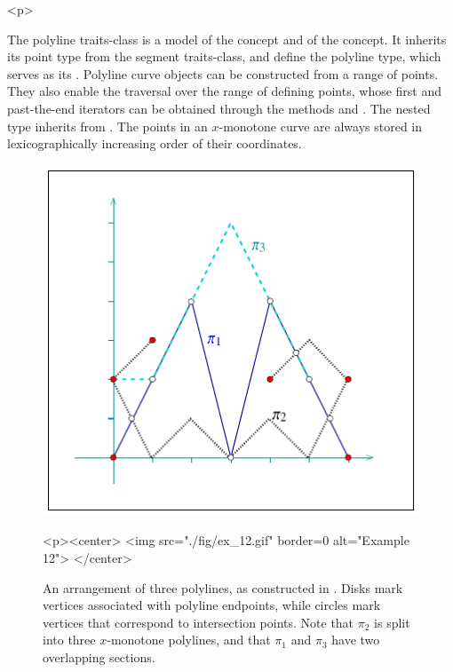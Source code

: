 \begin{ccHtmlOnly}<p>\end{ccHtmlOnly}
The polyline traits-class is a model of the
 concept and of the
 concept. It inherits its point
type from the segment traits-class, and define the polyline type,
which serves as its . Polyline curve objects can be
constructed from a range of points. They also enable the traversal
over the range of defining points, whose first and past-the-end
iterators can be obtained through the methods  and
. The nested  type inherits
from . The points in an $x$-monotone curve are
always stored in lexicographically increasing order of their
coordinates.

\begin{figure}[!htp]
\begin{ccTexOnly}
  \begin{center}
  \includegraphics{Arrangement_2/fig/ex_12}
  \end{center}
\end{ccTexOnly}
\begin{ccHtmlOnly}
  <p><center>
  <img src="./fig/ex_12.gif" border=0 alt="Example 12">
  </center>
\end{ccHtmlOnly}
\caption{An arrangement of three polylines, as constructed in
. Disks mark vertices associated with
polyline endpoints, while circles mark vertices that correspond
to intersection points. Note that $\pi_2$ is split into three
$x$-monotone polylines, and that $\pi_1$ and $\pi_3$ have two
overlapping sections.}
\label{arr_fig:ex_12}
\end{figure}

